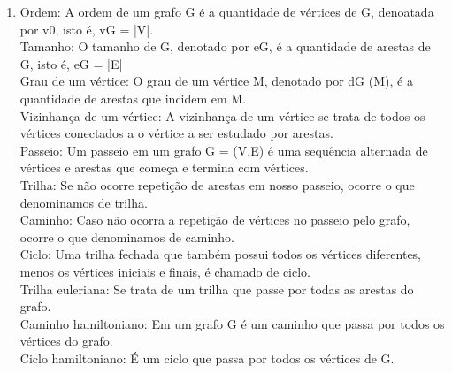 \documentclass[11pt,reqno]{amsart}
\begin{document}
\begin{enumerate}
\item Ordem: A ordem de um grafo G é a quantidade de vértices de G, denoatada por v0, isto é, vG = |V|.\\ Tamanho: O tamanho de G, 
denotado por eG, é a quantidade de arestas de G, isto é, eG = |E|\\ Grau de um vértice: O grau de um vértice M, denotado por dG (M), é 
a quantidade de arestas que incidem em M.\\ Vizinhança de um vértice: A vizinhança de um vértice se trata de todos os vértices 
conectados a o vértice a ser estudado por arestas.\\ Passeio: Um passeio em um grafo G = (V,E) é uma sequência alternada de vértices e 
arestas que começa e termina com vértices.\\ Trilha: Se não ocorre repetição de arestas em nosso passeio, ocorre o que denominamos de 
trilha.\\ Caminho: Caso não ocorra a repetição de vértices no passeio pelo grafo, ocorre o que denominamos de caminho.\\ Ciclo: Uma 
trilha fechada que também possui todos os vértices diferentes, menos os vértices iniciais e finais, é chamado de ciclo.\\ Trilha 
euleriana: Se trata de um trilha que passe por todas as arestas do grafo.\\ Caminho hamiltoniano: Em um grafo G é um caminho que passa 
por todos os vértices do grafo.\\ Ciclo hamiltoniano: É um ciclo que passa por todos os vértices de G.
\vspace{0.3cm}




\end{enumerate}
\end{document}
